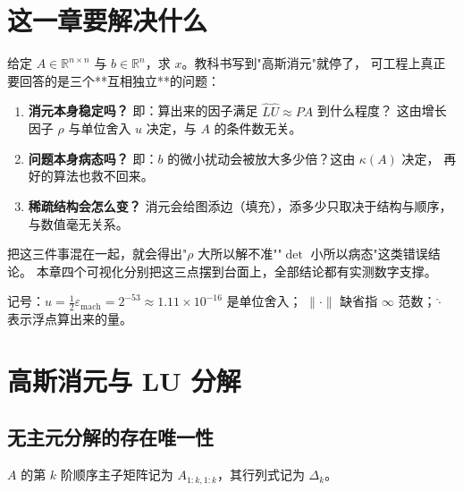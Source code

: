 

\section{这一章要解决什么}

给定 $A\in\mathbb{R}^{n\times n}$ 与 $b\in\mathbb{R}^n$，求 $x$。教科书写到"高斯消元"就停了，
可工程上真正要回答的是三个**互相独立**的问题：

\begin{enumerate}
  \item \textbf{消元本身稳定吗？} 即：算出来的因子满足 $\hat L\hat U \approx PA$ 到什么程度？
        这由增长因子 $\rho$ 与单位舍入 $u$ 决定，与 $A$ 的条件数无关。
  \item \textbf{问题本身病态吗？} 即：$b$ 的微小扰动会被放大多少倍？这由 $\kappa(A)$ 决定，
        再好的算法也救不回来。
  \item \textbf{稀疏结构会怎么变？} 消元会给图添边（填充），添多少只取决于结构与顺序，
        与数值毫无关系。
\end{enumerate}

把这三件事混在一起，就会得出"$\rho$ 大所以解不准""$\det$ 小所以病态"这类错误结论。
本章四个可视化分别把这三点摆到台面上，全部结论都有实测数字支撑。

记号：$u=\tfrac12\varepsilon_{\text{mach}}=2^{-53}\approx1.11\times10^{-16}$ 是单位舍入；
$\|\cdot\|$ 缺省指 $\infty$ 范数；$\hat{\cdot}$ 表示浮点算出来的量。

\section{高斯消元与 LU 分解}

\subsection{无主元分解的存在唯一性}

\begin{definition}[顺序主子矩阵]
$A$ 的第 $k$ 阶顺序主子矩阵记为 $A_{1:k,1:k}$，其行列式记为 $\Delta_k$。
\end{definition}

